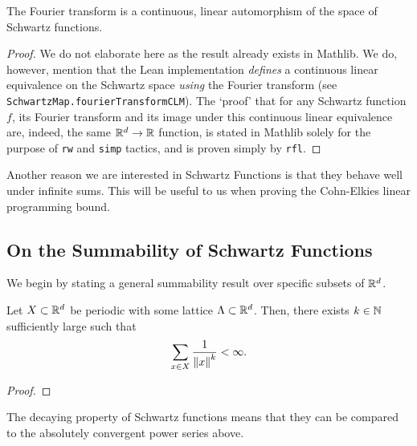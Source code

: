 \begin{lemma}\label{lemma:Fourier-transform-is-automorphism}\leanok
  The Fourier transform is a continuous, linear automorphism of the space of Schwartz functions.
\end{lemma}
\begin{proof}\leanok
  We do not elaborate here as the result already exists in Mathlib. We do, however, mention that the Lean implementation \emph{defines} a continuous linear equivalence on the Schwartz space \emph{using} the Fourier transform (see \verb|SchwartzMap.fourierTransformCLM|). The `proof' that for any Schwartz function $f$, its Fourier transform and its image under this continuous linear equivalence are, indeed, the same $\mathbb{R}^d \to \mathbb{R}$ function, is stated in Mathlib solely for the purpose of \verb|rw| and \verb|simp| tactics, and is proven simply by \verb|rfl|.
\end{proof}

Another reason we are interested in Schwartz Functions is that they behave well under infinite sums. This will be useful to us when proving the Cohn-Elkies linear programming bound.

\subsection{On the Summability of Schwartz Functions}

We begin by stating a general summability result over specific subsets of $\mathbb{R}^d$.

\begin{lemma}
  Let $X \subset \mathbb{R}^d$ be periodic with some lattice $\Lambda \subset \mathbb{R}^d$. Then, there exists $k \in \mathbb{N}$ sufficiently large such that
  \[
    \sum_{x \in X} \frac{1}{\left\lVert x \right\rVert^{k}} < \infty.
  \]
\end{lemma}
\begin{proof}
\end{proof}

The decaying property of Schwartz functions means that they can be compared to the absolutely convergent power series above.

